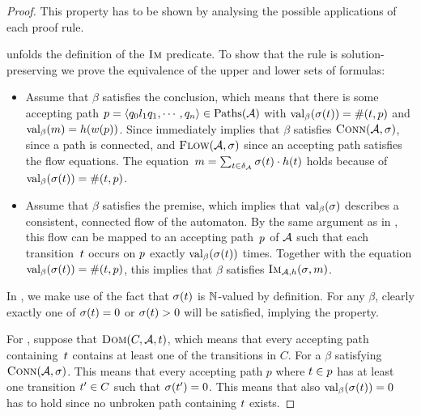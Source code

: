 \begin{proof}
  This property has to be shown by analysing the possible applications
  of each proof rule.

  \Expand{} unfolds the definition of the $\operatorname{\textsc{Im}}$ predicate. To show
  that the rule is solution-preserving we prove the equivalence of the
  upper and lower sets of formulas:
  \begin{itemize}
  \item Assume that $\beta$ satisfies the conclusion, which means that
    there is some accepting path
    $p = \left\langle q_0 l_1 q_1 , \cdots , q_n\right\rangle \in \operatorname{Paths}(\mathcal{A})$ with
    $\operatorname{val}_\beta(\operatorname{\sigma}(t)) = \operatorname{\#}(t,
    p)$ and $\operatorname{val}_\beta(m) =
    h(w(p))$. Since immediately implies that $\beta$
    satisfies $\operatorname{\textsc{Conn}}(\mathcal{A}, \operatorname{\sigma})$, since a path is
    connected, and $\textsc{Flow}(\mathcal{A}, \operatorname{\sigma})$ since an accepting
    path satisfies the flow equations. The
    equation~$m = \sum_{t \in
      \delta_{\mathcal{A}}}\operatorname{\sigma}(t) \cdot
    h(t)$ holds because of
    $\operatorname{val}_\beta(\operatorname{\sigma}(t)) = \operatorname{\#}(t,
    p)$.
  \item Assume that $\beta$ satisfies the premise, which implies that
    $\operatorname{val}_\beta(\operatorname{\sigma})$ describes a consistent, connected flow of
    the automaton. By the same argument as in
    \cite{generate-parikh-image}, this flow
    can be mapped to an accepting path~$p$ of $\mathcal{A}$ such
    that each transition~$t$ occurs on $p$ exactly
    $\operatorname{val}_\beta(\operatorname{\sigma}(t))$ times. Together with the equation
    $\operatorname{val}_\beta(\operatorname{\sigma}(t)) = \operatorname{\#}(t,
    p)$, this implies that $\beta$ satisfies $\operatorname{\textsc{Im}}_{\mathcal{A}, h}(\operatorname{\sigma}, m)$.
  \end{itemize}

  In \Split{}, we make use of the fact that $\operatorname{\sigma}(t)$ is
  $\mathbb{N}$-valued by definition. For any $\beta$, clearly exactly
  one of $\operatorname{\sigma}(t) = 0$ or $\operatorname{\sigma}(t) > 0$ will
  be satisfied, implying the property.

  For \Propagate{}, suppose that $\operatorname{\textsc{Dom}}(C, \mathcal{A}, t)$, which
  means that every accepting path containing~$t$ contains at least one
  of the transitions in $C$. For a $\beta$ satisfying $\operatorname{\textsc{Conn}}(\mathcal{A},
  \operatorname{\sigma})$. This means that every accepting path $p$ where $t \in p$
  has at least one transition $t' \in C$ such that
  $\operatorname{\sigma}(t') = 0$. This means that also
  $\operatorname{val}_\beta(\operatorname{\sigma}(t)) = 0$ has to hold since no unbroken path
  containing $t$ exists.


\end{proof}
